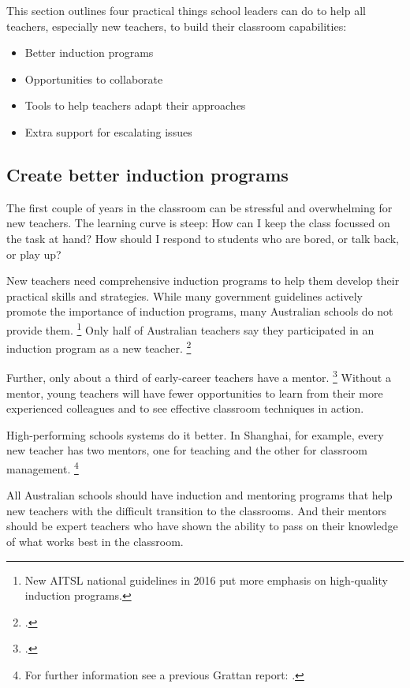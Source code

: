 \documentclass{grattan}
\begin{document}
This section outlines four practical things school leaders can do to help all teachers, especially new teachers, to build their classroom capabilities:

\begin{itemize}
    \item Better induction programs
    \item Opportunities to collaborate
    \item Tools to help teachers adapt their approaches
    \item Extra support for escalating issues
\end{itemize}

\subsection{Create better induction programs}\label{subsubsec:create-better-induction-programs}
The first couple of years in the classroom can be stressful and overwhelming for new teachers. The learning curve is steep: How can I keep the class focussed on the task at hand? How should I respond to students who are bored, or talk back, or play up?

New teachers need comprehensive induction programs to help them develop their practical skills and strategies. While many government guidelines actively promote the importance of induction programs, many Australian schools do not provide them.%
  \footnote{New AITSL national guidelines in 2016 put more emphasis on high-quality induction programs.}
Only half of Australian teachers say they participated in an induction program as a new teacher.%
    \footcite[][Table 4.1]{OECD2014TALIS2013ResultsTeachingLearning}

Further, only about a third of early-career teachers have a mentor.%
   \footcite[][Table 4.4]{OECD2014TALIS2013ResultsTeachingLearning}
Without a mentor, young teachers will have fewer opportunities to learn from their more experienced colleagues and to see effective classroom techniques in action.

High-performing schools systems do it better. In Shanghai, for example, every new teacher has two mentors, one for teaching and the other for classroom management.%
    \footnote{For further information see a previous Grattan report: \textcite{Jensen-2012-Catching-up-learning-from-best-in-East-Asia}.}

All Australian schools should have induction and mentoring programs that help new teachers with the difficult transition to the classrooms. And their mentors should be expert teachers who have shown the ability to pass on their knowledge of what works best in the classroom.
\end{document}
